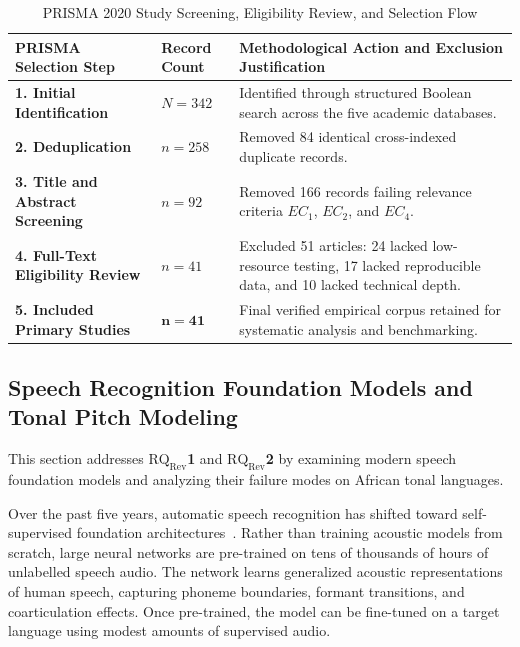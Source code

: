 \documentclass[a4paper,11pt]{article}
\begin{document}
\begin{table}[t]
\centering
\small
\caption{PRISMA 2020 Study Screening, Eligibility Review, and Selection Flow}
\label{tab:prisma_flow}
\begin{tabular}{>{\raggedright\arraybackslash}p{4.8cm} p{2.2cm} >{\raggedright\arraybackslash}p{9.4cm}}
\toprule
\textbf{PRISMA Selection Step} & \textbf{Record Count} & \textbf{Methodological Action and Exclusion Justification} \\
\midrule
\textbf{1. Initial Identification} & $N = 342$ & Identified through structured Boolean search across the five academic databases. \\
\addlinespace
\textbf{2. Deduplication} & $n = 258$ & Removed 84 identical cross-indexed duplicate records. \\
\addlinespace
\textbf{3. Title and Abstract Screening} & $n = 92$ & Removed 166 records failing relevance criteria $EC_1$, $EC_2$, and $EC_4$. \\
\addlinespace
\textbf{4. Full-Text Eligibility Review} & $n = 41$ & Excluded 51 articles: 24 lacked low-resource testing, 17 lacked reproducible data, and 10 lacked technical depth. \\
\addlinespace
\textbf{5. Included Primary Studies} & $\mathbf{n = 41}$ & Final verified empirical corpus retained for systematic analysis and benchmarking. \\
\bottomrule
\end{tabular}
\end{table}

\subsection{Speech Recognition Foundation Models and Tonal Pitch Modeling}
\label{sec:chap2_asr}

This section addresses \textbf{$\text{RQ}_{\text{Rev}}$1} and \textbf{$\text{RQ}_{\text{Rev}}$2} by examining modern speech foundation models and analyzing their failure modes on African tonal languages.

Over the past five years, automatic speech recognition has shifted toward self-supervised foundation architectures~\cite{baevski2020wav2vec, babu2022xlsr, pratap2024scaling, radford2023robust}. Rather than training acoustic models from scratch, large neural networks are pre-trained on tens of thousands of hours of unlabelled speech audio. The network learns generalized acoustic representations of human speech, capturing phoneme boundaries, formant transitions, and coarticulation effects. Once pre-trained, the model can be fine-tuned on a target language using modest amounts of supervised audio.
\end{document}
